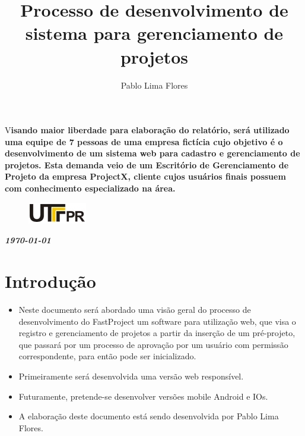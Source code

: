 \documentclass[	DIV=calc,%
							paper=a4,%
							fontsize=12pt,%
							onecolumn]{scrartcl}	 					%
\title{Processo de desenvolvimento de sistema para gerenciamento de projetos}					%
\author{Pablo Lima Flores }  	%
\date{}																				%
\newcommand{\initial}[1]{%
     \lettrine[lines=3,lhang=0.3,nindent=0em]{
     				\color{DarkGoldenrod}
     				{\textsf{#1}}}{}}
\begin{document}
\maketitle
\thispagestyle{fancy} 	
\thispagestyle{empty}		%




\initial{V}\textbf{isando maior liberdade para elaboração do relatório, será utilizado uma equipe de 7 pessoas de uma empresa fictícia cujo objetivo é o desenvolvimento de um sistema web para cadastro e gerenciamento de projetos. 
	Esta demanda veio de um Escritório de Gerenciamento de Projeto da empresa ProjectX, cliente cujos usuários finais possuem com conhecimento especializado na área.}

\begin{figure}
	\centering
	\includegraphics{utfpr}
\end{figure}

\vspace{3cm}
\centerline{\textit{\textbf{\today}}}

\clearpage
    \renewcommand*\listfigurename{Lista de figuras}
\listoffigures

\clearpage
\renewcommand{\contentsname}{Sumário}
\tableofcontents
\clearpage

\section{Introdução}

\begin{itemize}
\item Neste documento será abordado uma visão geral do processo de desenvolvimento do FastProject um software para utilização web, que visa o registro e gerenciamento de projetos a partir da inserção de um pré-projeto, que passará por um processo de aprovação por um usuário com permissão correspondente, para então pode ser inicializado. 
\item Primeiramente será desenvolvida uma versão web responsível.
\item Futuramente, pretende-se desenvolver versões mobile Android e IOs.
\item A elaboração deste documento está sendo desenvolvida por Pablo Lima Flores.
\end{itemize}
\end{document}
